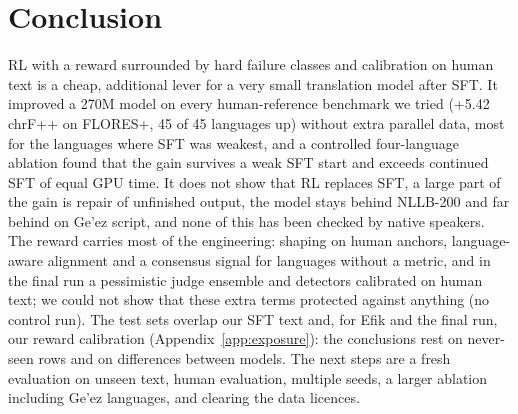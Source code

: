 \section{Conclusion}
RL with a reward surrounded by hard failure classes and calibration on human text is a cheap, additional lever for a very small translation model after SFT. It improved a 270M model on every human-reference benchmark we tried (+5.42 chrF++ on FLORES+, 45 of 45 languages up) without extra parallel data, most for the languages where SFT was weakest, and a controlled four-language ablation found that the gain survives a weak SFT start and exceeds continued SFT of equal GPU time. It does not show that RL replaces SFT, a large part of the gain is repair of unfinished output, the model stays behind NLLB-200 and far behind on Ge'ez script, and none of this has been checked by native speakers. The reward carries most of the engineering: shaping on human anchors, language-aware alignment and a consensus signal for languages without a metric, and in the final run a pessimistic judge ensemble and detectors calibrated on human text; we could not show that these extra terms protected against anything (no control run). The test sets overlap our SFT text and, for Efik and the final run, our reward calibration (Appendix~\ref{app:exposure}): the conclusions rest on never-seen rows and on differences between models. The next steps are a fresh evaluation on unseen text, human evaluation, multiple seeds, a larger ablation including Ge'ez languages, and clearing the data licences.

